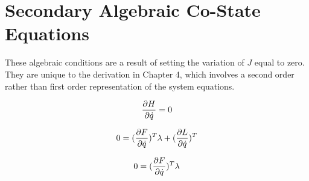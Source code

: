 \section{Secondary Algebraic Co-State Equations}

These algebraic conditions are a result of setting the variation of $J$ equal to zero. They are unique to the derivation in Chapter 4, which involves a second order rather than first order representation of the system equations.

\begin{equation}
    \frac{\partial H}{\partial \dot q} = 0
\end{equation}

\begin{equation}
0 = (\frac{\partial F}{\partial \dot q})^T \lambda + (\frac{\partial L}{\partial \dot q})^T
\end{equation}

\begin{equation}
    0 = (\frac{\partial F}{\partial \dot q})^T \lambda
\end{equation}


